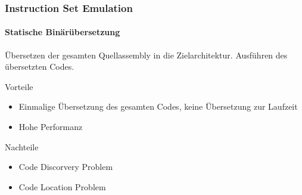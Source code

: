 \begin{frame}
    \frametitle{Instruction Set Emulation}
    \framesubtitle{Statische Binärübersetzung}

    Übersetzen der gesamten Quellassembly in die Zielarchitektur.
    Ausführen des übersetzten Codes.

    \vspace{0.50cm}

    \begin{exampleblock}{Vorteile}
        \begin{itemize}
            \item[$\textcolor{TUMGreen}\blacksquare$] Einmalige Übersetzung des gesamten Codes, keine Übersetzung zur Laufzeit
            \item[$\textcolor{TUMGreen}\blacksquare$] Hohe Performanz
        \end{itemize}
    \end{exampleblock}

    \vspace{0.50cm}

    \begin{alertblock}{Nachteile}
        \begin{itemize}
            \item[$\textcolor{TUMOrange}\blacksquare$] Code Discorvery Problem
            \item[$\textcolor{TUMOrange}\blacksquare$] Code Location Problem
        \end{itemize}
    \end{alertblock}
\end{frame}